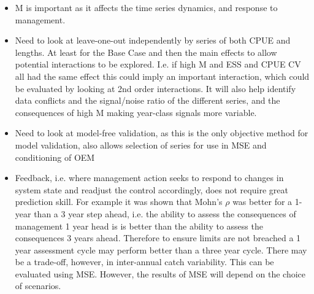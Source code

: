 \begin{itemize}
    \item M is important as it affects the time series dynamics, and response to management.
    \item Need to look at leave-one-out independently by series of both CPUE and lengths. At least for the Base Case and then the main effects to allow potential interactions to be explored. I.e. if high M and ESS and CPUE CV all had the same effect this could imply an important interaction, which could be evaluated by looking at 2nd order interactions. It will also help identify data conflicts and the signal/noise ratio of the different series, and the consequences of high M making year-class signals more variable. 
    \item Need to look at model-free validation, as this is the only objective method for model validation, also allows selection of series for use in MSE and conditioning of OEM
    \item Feedback, i.e. where management action seeks to respond to changes in system state and readjust the control accordingly, does not require great prediction skill. For example it was shown that Mohn's $\rho$ was better for a 1-year than a 3 year step ahead, i.e. the ability to assess the consequences of management 1 year head is is better than the ability to assess the consequences 3 years ahead. Therefore to ensure limits are not breached a 1 year assessment cycle may perform better than a three year cycle. There may be a trade-off, however, in inter-annual catch variability. This can be evaluated using MSE. However, the results of MSE will depend on the choice of scenarios.    
    

\end{itemize}

